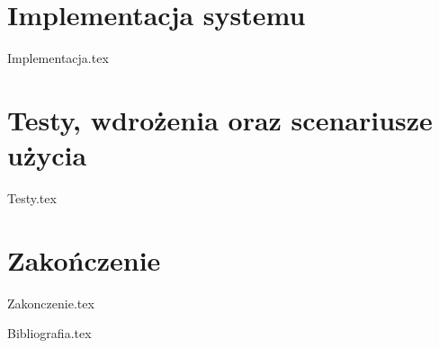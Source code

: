 \documentclass[12pt,a4paper,leqno,oneside,titlepage]{mwrep}
\begin{document}
\chapter{Implementacja systemu}
{Implementacja.tex}

\chapter{Testy, wdrożenia oraz scenariusze użycia}
{Testy.tex}

\chapter{Zakończenie}
{Zakonczenie.tex}


{Bibliografia.tex}
\end{document}

